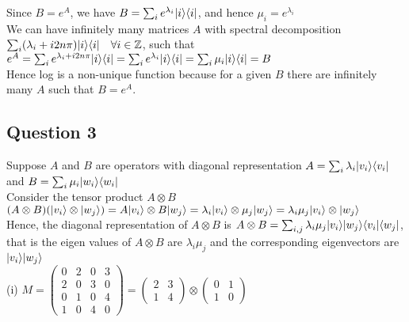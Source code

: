 \documentclass{article}
\DeclarePairedDelimiter\bra{\langle}{\rvert}
\DeclarePairedDelimiter\ket{\lvert}{\rangle}
\begin{document}
\noindent
Since $B= e^A$, we have $B = \sum_{i} e^{\lambda_i} \ket{i}\bra{i}$, and hence $\mu_i = e^{\lambda_i}$\\

\noindent
We can have infinitely many matrices $A$ with spectral decomposition $\sum_{i} (\lambda_i + i2n\pi) \ket{i}\bra{i}  \quad \forall i \in \mathbb{Z}  $, such that $e^A = \sum_i e^{\lambda_i+ i2n\pi} \ket{i}\bra{i} = \sum_i e^{\lambda_i} \ket{i}\bra{i} = \sum_i \mu_i \ket{i}\bra{i} = B$\\


\noindent
Hence log is a non-unique function because for a given $B$ there are infinitely many $A$ such that $B = e^A$. 
\subsection{Question 3}

Suppose $A$ and $B$ are operators with diagonal representation $A = \sum_{i} \lambda_i \ket{v_i}\bra{v_i}$ and $B = \sum_{i} \mu_i \ket{w_i}\bra{w_i}$\\

\noindent
Consider the tensor product $A \otimes B$\\

$(A \otimes B)(\ket{v_i} \otimes \ket{w_j}) = A\ket{v_i} \otimes B\ket{w_j} = \lambda_i \ket{v_i} \otimes \mu_j \ket{w_j} = \lambda_i \mu_j \ket{v_i} \otimes \ket{w_j}$\\ 

\noindent
Hence, the diagonal representation of $A \otimes B$ is $A \otimes B = \sum_{i,j} \lambda_i \mu_j \ket{v_i}\ket{w_j}\bra{v_i}\bra{w_j}$, that is the eigen values of $A \otimes B$ are $\lambda_i \mu_j$ and the corresponding eigenvectors are $\ket{v_i}\ket{w_j}$\\

\noindent
(i) $M = \begin{pmatrix}
    0 & 2 & 0 & 3\\
    2 & 0 & 3 & 0\\
    0 & 1 & 0 & 4\\
    1 & 0 & 4 & 0
\end{pmatrix}
 =    \begin{pmatrix}2 & 3\\ 1 & 4 \end{pmatrix} \otimes \begin{pmatrix} 0 & 1\\ 1 & 0 \end{pmatrix}$\\\\
\end{document}

